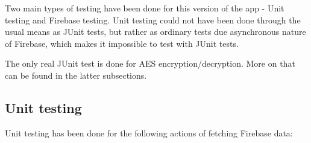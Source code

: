 \hspace{\parindent}  Two main types of testing have been done for this version of the app - Unit testing and Firebase testing. Unit testing could not have been done through the usual means as JUnit tests, but rather as ordinary tests due asynchronous nature of Firebase, which makes it impossible to test with JUnit tests. \newline

The only real JUnit test is done for AES encryption/decryption. More on that can be found in the latter subsections. \newline




\subsection{Unit testing}
\hspace{\parindent} 
Unit testing has been done for the following actions of fetching Firebase data:
